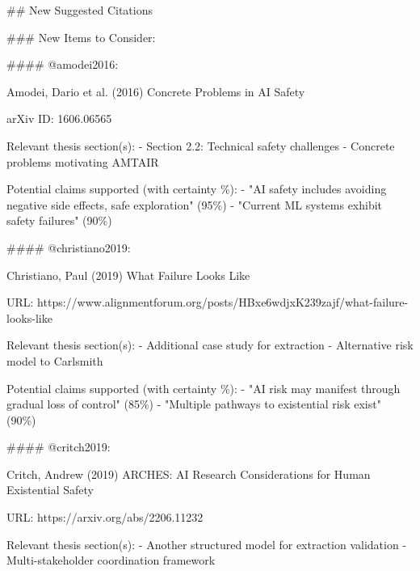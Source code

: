 \documentclass[
  11pt,
  letterpaper,
]{book}
\newenvironment{Shaded}{\begin{snugshade}}{\end{snugshade}}
\newcommand{\FunctionTok}[1]{\textcolor[rgb]{0.28,0.35,0.67}{#1}}
\newcommand{\InformationTok}[1]{\textcolor[rgb]{0.37,0.37,0.37}{#1}}
\begin{document}
\begin{Shaded}
\begin{Highlighting}[]
\FunctionTok{\#\# New Suggested Citations}

\FunctionTok{\#\#\# New Items to Consider:}

\FunctionTok{\#\#\#\# \textasciigrave{}@amodei2016\textasciigrave{}: }

\InformationTok{    Amodei, Dario et al. (2016)}
\InformationTok{    Concrete Problems in AI Safety}

\InformationTok{    arXiv ID: 1606.06565}

\InformationTok{    Relevant thesis section(s):}
\InformationTok{    {-} Section 2.2: Technical safety challenges}
\InformationTok{    {-} Concrete problems motivating AMTAIR}

\InformationTok{    Potential claims supported (with certainty \%):}
\InformationTok{    {-} "AI safety includes avoiding negative side effects, safe exploration" (95\%)}
\InformationTok{    {-} "Current ML systems exhibit safety failures" (90\%)}

\FunctionTok{\#\#\#\# \textasciigrave{}@christiano2019\textasciigrave{}: }

\InformationTok{    Christiano, Paul (2019)}
\InformationTok{    What Failure Looks Like}

\InformationTok{    URL: https://www.alignmentforum.org/posts/HBxe6wdjxK239zajf/what{-}failure{-}looks{-}like}

\InformationTok{    Relevant thesis section(s):}
\InformationTok{    {-} Additional case study for extraction}
\InformationTok{    {-} Alternative risk model to Carlsmith}

\InformationTok{    Potential claims supported (with certainty \%):}
\InformationTok{    {-} "AI risk may manifest through gradual loss of control" (85\%)}
\InformationTok{    {-} "Multiple pathways to existential risk exist" (90\%)}

\FunctionTok{\#\#\#\# \textasciigrave{}@critch2019\textasciigrave{}: }

\InformationTok{    Critch, Andrew (2019)}
\InformationTok{    ARCHES: AI Research Considerations for Human Existential Safety}

\InformationTok{    URL: https://arxiv.org/abs/2206.11232}

\InformationTok{    Relevant thesis section(s):}
\InformationTok{    {-} Another structured model for extraction validation}
\InformationTok{    {-} Multi{-}stakeholder coordination framework}


\end{Highlighting}
\end{Shaded}
\end{document}
